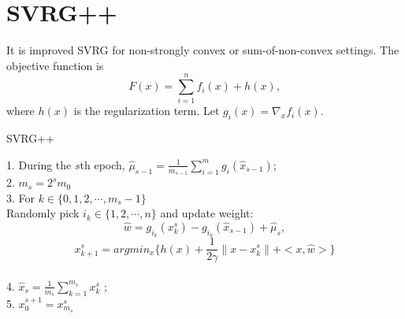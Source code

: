 \documentclass[11pt]{article} %
\begin{document}
\begin{algorithm}[htb]
\begin{algorithm}[t]
\end{algorithm}
\section{SVRG++}
It is improved SVRG for non-strongly convex or sum-of-non-convex settings.%
The objective function is $$F(x)=\sum _{i=1}^{n}f_{i}(x)+h(x),$$where $h(x)$ is the regularization term.
Let $g_i(x)={\nabla}_{x} f_i(x)$.

\begin{algorithm} %
\caption{SVRG++} %
\label{SVRG++} %
1. During the $s$th epoch, $\hat{\mu}_{s-1}=\frac{1}{m_{s-1}}\sum_{i=1}^{m} g_i ({\hat{x}}_{s-1})$;\\
2. $m_s=2^s m_{0}$\\
3. For $k\in \{ 0,1, 2, \cdots, m_s -1\}$\\

 Randomly pick $i_k \in \{1,2,\cdots, n\}$ and update weight:
 $$ \hat{w}=g_{i_k}({x}_{k}^s)-g_{i_k}(\hat{x}_{s-1})+\hat{\mu}_s,$$
 $$x_{k+1}^s=argmin_{x}\{ h(x)+\frac{1}{2\gamma}\| x- x_k^s\|+<x,\hat{w}>\}$$\\

4. ${\hat x}_{s}=\frac{1}{m_s}\sum _{k=1}^{m_s}x_{k}^s$ ;\\
5. $x_0 ^{s+1}=x_{m_s}^s$
\end{algorithm}



\end{algorithm}
\end{document}
